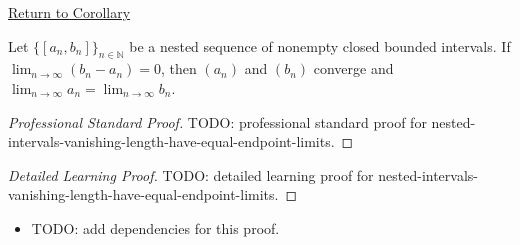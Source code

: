 \newpage
{}
\label{prf:nested-intervals-vanishing-length-have-equal-endpoint-limits}

\begin{remark*}[Return]
\hyperref[cor:nested-intervals-vanishing-length-have-equal-endpoint-limits]{Return to Corollary}
\end{remark*}

\begin{corollary*}
Let $\{[a_n,b_n]\}_{n\in\mathbb N}$ be a nested sequence of nonempty closed
bounded intervals. If $\lim_{n\to\infty}(b_n-a_n)=0$, then $(a_n)$ and
$(b_n)$ converge and $\lim_{n\to\infty}a_n=\lim_{n\to\infty}b_n$.
\end{corollary*}

\begin{proof}[Professional Standard Proof]
\LRAProofBodyStart
TODO: professional standard proof for nested-intervals-vanishing-length-have-equal-endpoint-limits.
\end{proof}

\begin{proof}[Detailed Learning Proof]
\LRAProofBodyStart
TODO: detailed learning proof for nested-intervals-vanishing-length-have-equal-endpoint-limits.
\end{proof}

\begin{remark*}
\end{remark*}

\begin{dependencies}
\begin{itemize}
  \item TODO: add dependencies for this proof.
\end{itemize}
\end{dependencies}

\clearpage
